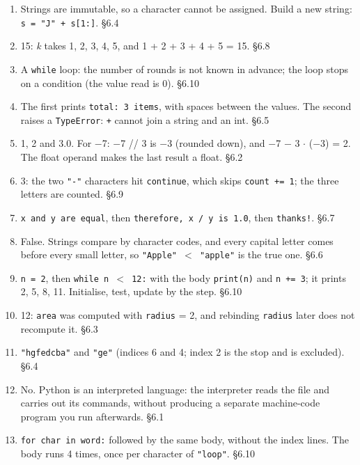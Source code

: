 \documentclass[11pt]{article}
\begin{document}
\begin{keepsection}
\begin{enumerate}
\item Strings are immutable, so a character cannot be assigned. Build a new string: \texttt{s = "J" + s[1:]}. \hfill{\small\color{FAUblue}§6.4}
\item 15: \textit{k} takes 1, 2, 3, 4, 5, and 1 + 2 + 3 + 4 + 5 = 15. \hfill{\small\color{FAUblue}§6.8}
\item A \texttt{while} loop: the number of rounds is not known in advance; the loop stops on a condition (the value read is 0). \hfill{\small\color{FAUblue}§6.10}
\item The first prints \texttt{total: 3 items}, with spaces between the values. The second raises a \texttt{TypeError}: \texttt{+} cannot join a string and an int. \hfill{\small\color{FAUblue}§6.5}
\item 1, 2 and 3.0. For \ensuremath{-}7: \ensuremath{-}7 // 3 is \ensuremath{-}3 (rounded down), and \ensuremath{-}7 \ensuremath{-} 3 \ensuremath{\cdot} (\ensuremath{-}3) = 2. The float operand makes the last result a float. \hfill{\small\color{FAUblue}§6.2}
\item 3: the two \texttt{"-"} characters hit \texttt{continue}, which skips \texttt{count += 1}; the three letters are counted. \hfill{\small\color{FAUblue}§6.9}
\item \texttt{x and y are equal}, then \texttt{therefore, x / y is 1.0}, then \texttt{thanks!}. \hfill{\small\color{FAUblue}§6.7}
\item False. Strings compare by character codes, and every capital letter comes before every small letter, so \texttt{"Apple" \ensuremath{<} "apple"} is the true one. \hfill{\small\color{FAUblue}§6.6}
\item \texttt{n = 2}, then \texttt{while n \ensuremath{<} 12:} with the body \texttt{print(n)} and \texttt{n += 3}; it prints 2, 5, 8, 11. Initialise, test, update by the step. \hfill{\small\color{FAUblue}§6.10}
\item 12: \texttt{area} was computed with \texttt{radius} = 2, and rebinding \texttt{radius} later does not recompute it. \hfill{\small\color{FAUblue}§6.3}
\item \texttt{"hgfedcba"} and \texttt{"ge"} (indices 6 and 4; index 2 is the stop and is excluded). \hfill{\small\color{FAUblue}§6.4}
\item No. Python is an interpreted language: the interpreter reads the file and carries out its commands, without producing a separate machine-code program you run afterwards. \hfill{\small\color{FAUblue}§6.1}
\item \texttt{for char in word:} followed by the same body, without the index lines. The body runs 4 times, once per character of \texttt{"loop"}. \hfill{\small\color{FAUblue}§6.10}
\end{enumerate}

\end{keepsection}
\end{document}

